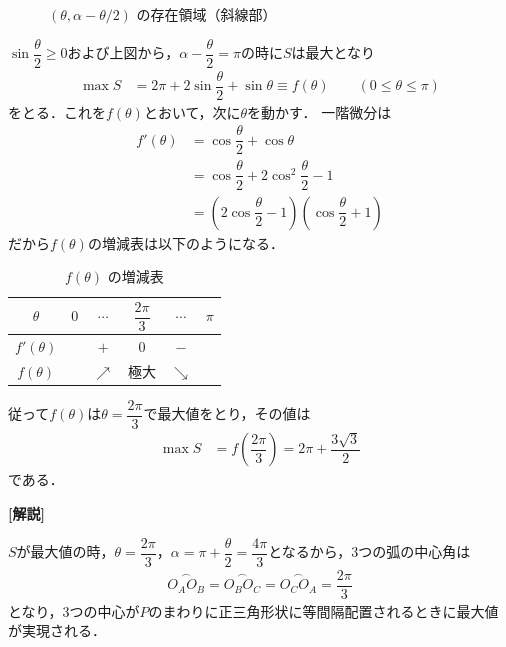 \documentclass[../../main.tex]{subfiles}
\begin{document}
\begin{figure}[htb]
\begin{center}
  \end{center}
  \caption{$(\theta, \alpha - \theta/2)$ の存在領域（斜線部）}
\end{figure}

$\sin\dfrac{\theta}{2} \ge 0$および上図から，$\alpha-\dfrac{\theta}{2} = \pi$の時に$S$は最大となり
\begin{align}
  \max S
  &= 2\pi + 2\sin\dfrac{\theta}{2}+\sin\theta
  \equiv f(\theta)\qquad(0\le\theta\le\pi)
\end{align}
をとる．これを$f(\theta)$とおいて，次に$\theta$を動かす．
一階微分は
\begin{align}
  f'(\theta)
  &= \cos\dfrac{\theta}{2} + \cos\theta \\
  &= \cos\dfrac{\theta}{2} + 2\cos^2\dfrac{\theta}{2} -1 \\
  &= \left(2\cos\dfrac{\theta}{2} - 1\right)\left(\cos\dfrac{\theta}{2} + 1\right)
\end{align}
だから$f(\theta)$の増減表は以下のようになる．

\begin{table}[H]
  \centering
  \caption{$f(\theta)$ の増減表}
  \label{tab:f_theta}
  \begin{tabular}{c|ccccc}
    $\theta$ & $0$ & $\cdots$ & $\dfrac{2\pi}{3}$ & $\cdots$ & $\pi$ \\ \hline
    $f'(\theta)$ & & $+$ & $0$ & $-$ & \\ \hline
    $f(\theta)$ & & $\nearrow$ & 極大 & $\searrow$ &
  \end{tabular}
\end{table}

従って$f(\theta)$は$\theta = \dfrac{2\pi}{3}$で最大値をとり，その値は
\begin{align}
  \max S
  &= f\left(\dfrac{2\pi}{3}\right)
  = 2\pi + \dfrac{3\sqrt{3}}{2}
\end{align}
である．

{\bf [解説]}

$S$が最大値の時，$\theta=\dfrac{2\pi}{3}$，$\alpha=\pi+\dfrac{\theta}{2}=\dfrac{4\pi}{3}$となるから，3つの弧の中心角は
\begin{align}
  \overset{\frown}{O_AO_B}=\overset{\frown}{O_BO_C}=\overset{\frown}{O_CO_A}=\dfrac{2\pi}{3}
\end{align}
となり，3つの中心が$P$のまわりに正三角形状に等間隔配置されるときに最大値が実現される．
\end{document}
